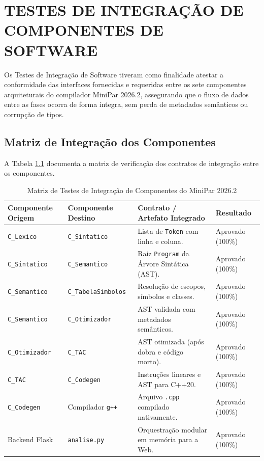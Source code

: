 \chapter{TESTES DE INTEGRAÇÃO DE COMPONENTES DE SOFTWARE}

Os Testes de Integração de Software tiveram como finalidade atestar a conformidade das interfaces fornecidas e requeridas entre os sete componentes arquiteturais do compilador MiniPar 2026.2, assegurando que o fluxo de dados entre as fases ocorra de forma íntegra, sem perda de metadados semânticos ou corrupção de tipos.

\section{Matriz de Integração dos Componentes}

A Tabela \ref{tab:matriz_integracao} documenta a matriz de verificação dos contratos de integração entre os componentes.

\begin{table}[htbp]
\centering
\caption{Matriz de Testes de Integração de Componentes do MiniPar 2026.2}
\label{tab:matriz_integracao}
\small
\begin{tabular}{p{2.8cm}p{2.8cm}p{5.5cm}p{2.2cm}}
\toprule
Componente Origem & Componente Destino & Contrato / Artefato Integrado & Resultado \\
\midrule
\texttt{C\_Lexico} & \texttt{C\_Sintatico} & Lista de \texttt{Token} com linha e coluna. & Aprovado (100\%) \\
\texttt{C\_Sintatico} & \texttt{C\_Semantico} & Raiz \texttt{Program} da Árvore Sintática (AST). & Aprovado (100\%) \\
\texttt{C\_Semantico} & \texttt{C\_TabelaSimbolos} & Resolução de escopos, símbolos e classes. & Aprovado (100\%) \\
\texttt{C\_Semantico} & \texttt{C\_Otimizador} & AST validada com metadados semânticos. & Aprovado (100\%) \\
\texttt{C\_Otimizador} & \texttt{C\_TAC} & AST otimizada (após dobra e código morto). & Aprovado (100\%) \\
\texttt{C\_TAC} & \texttt{C\_Codegen} & Instruções lineares e AST para C++20. & Aprovado (100\%) \\
\texttt{C\_Codegen} & Compilador \texttt{g++} & Arquivo \texttt{.cpp} compilado nativamente. & Aprovado (100\%) \\
Backend Flask & \texttt{analise.py} & Orquestração modular em memória para a Web. & Aprovado (100\%) \\
\bottomrule
\end{tabular}
\end{table}

